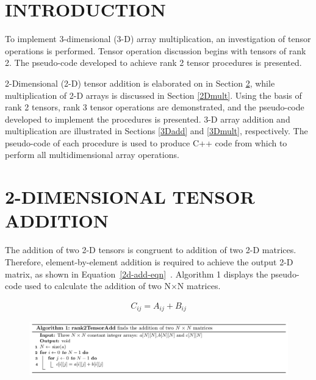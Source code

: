 \maketitle
\thispagestyle{empty}\pagestyle{empty}

%

\section{INTRODUCTION} 

To implement 3-dimensional (3-D) array multiplication, an investigation of tensor operations is performed. Tensor operation discussion begins with tensors of rank 2. The pseudo-code developed to achieve rank 2 tensor procedures is presented. 

2-Dimensional (2-D) tensor addition is elaborated on in Section \ref{2Dadd}, while multiplication of 2-D arrays is discussed in Section \ref{2Dmult}. Using the basis of rank 2 tensors, rank 3 tensor operations are demonstrated, and the pseudo-code developed to implement the procedures is presented. 3-D array addition and multiplication are illustrated in Sections \ref{3Dadd} and \ref{3Dmult}, respectively. The pseudo-code of each procedure is used to produce C++ code from which to perform all multidimensional array operations.  


\section{2-DIMENSIONAL TENSOR ADDITION} \label{2Dadd}

The addition of two 2-D tensors is congruent to addition of two 2-D matrices. Therefore, element-by-element addition is required to achieve the output 2-D matrix, as shown in Equation~\ref{2d-add-eqn}~\cite{matrix_Add}. Algorithm 1 displays the pseudo-code used to calculate the addition of two N$\times$N matrices. \vspace{-5mm}

\begin{align}
C_{ij} = A_{ij} + B_{ij} \label{2d-add-eqn}
\end{align}

\vspace{-1.5mm}
\begin{figure}[H] 
\includegraphics[width=\textwidth]{build/Algo1.png} 
\end{figure}

